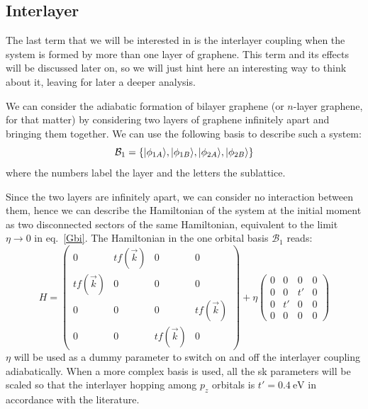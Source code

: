 \subsection{Interlayer}
The last term that we will be interested in is the interlayer coupling when the system is formed by more than one layer of graphene. This term and its effects will be discussed later on, so we will just hint here an interesting way to think about it, leaving for later a deeper analysis.

We can consider the adiabatic formation of bilayer graphene (or $n$-layer graphene, for that matter) by considering two layers of graphene infinitely apart and bringing them together.
We can use the following basis to describe such a system:
\begin{equation}
  \mathcal{B}_1 = \left\{|\phi_{1A}\rangle, |\phi_{1B}\rangle,
                        |\phi_{2A}\rangle, |\phi_{2B}\rangle\right\}
\end{equation}
where the numbers label the layer and the letters the sublattice.

Since the two layers are infinitely apart, we can consider no interaction between them, hence we can describe the Hamiltonian of the system at the initial moment as two disconnected sectors of the same Hamiltonian, equivalent to the limit $\eta\rightarrow0$ in eq.~\eqref{Gbi}. The Hamiltonian in the one orbital basis $\mathcal{B}_1$ reads:
\begin{equation}
  H = \left(\begin{array}{cc|cc}
     0 & tf(\vec{k}) & 0 & 0 \\
     tf(\vec{k}) & 0 & 0 & 0 \\ \hline
     0 & 0 & 0 & tf(\vec{k}) \\
     0 & 0 & tf(\vec{k}) & 0
  \end{array}\right) + 
  \eta \left(\begin{array}{cc|cc}
     0 & 0  & 0  & 0 \\
     0 & 0  & t' & 0 \\ \hline
     0 & t' & 0  & 0 \\
     0 & 0  & 0  & 0
  \end{array}\right)
\label{Gbi}
\end{equation}
$\eta$ will be used as a dummy parameter to switch on and off the interlayer coupling adiabatically.
When a more complex basis is used, all the \ac{sk} parameters will be scaled so that the interlayer hopping among $p_z$ orbitals is $t'=\SI{0.4}{\eV}$ in accordance with the literature\cite{KatsnelsonBook}.



